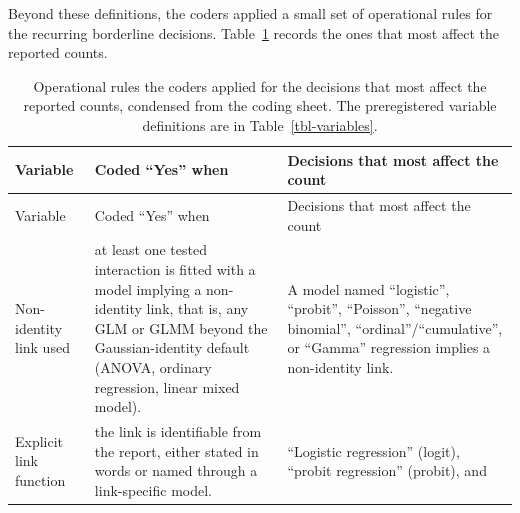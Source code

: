 \documentclass[
  man,
  floatsintext,
  longtable,
  nolmodern,
  notxfonts,
  notimes,
  colorlinks=true,linkcolor=blue,citecolor=blue,urlcolor=blue]{apa7}
\begin{document}
Beyond these definitions, the coders applied a small set of operational
rules for the recurring borderline decisions.
Table~\ref{tbl-coding-rules} records the ones that most affect the
reported counts.

\begin{longtable}[]{@{}
  >{\raggedright\arraybackslash}p{}
  >{\raggedright\arraybackslash}p{}
  >{\raggedright\arraybackslash}p{}@{}}
\caption{Operational rules the coders applied for the decisions that
most affect the reported counts, condensed from the coding sheet. The
preregistered variable definitions are in
Table~\ref{tbl-variables}.}\label{tbl-coding-rules}\tabularnewline
\toprule\noalign{}
\begin{minipage}[b]{\linewidth}\raggedright
Variable
\end{minipage} & \begin{minipage}[b]{\linewidth}\raggedright
Coded ``Yes'' when
\end{minipage} & \begin{minipage}[b]{\linewidth}\raggedright
Decisions that most affect the count
\end{minipage} \\
\midrule\noalign{}
\endfirsthead
\toprule\noalign{}
\begin{minipage}[b]{\linewidth}\raggedright
Variable
\end{minipage} & \begin{minipage}[b]{\linewidth}\raggedright
Coded ``Yes'' when
\end{minipage} & \begin{minipage}[b]{\linewidth}\raggedright
Decisions that most affect the count
\end{minipage} \\
\midrule\noalign{}
\endhead
\bottomrule\noalign{}
\endlastfoot
Non-identity link used & at least one tested interaction is fitted with
a model implying a non-identity link, that is, any GLM or GLMM beyond
the Gaussian-identity default (ANOVA, ordinary regression, linear mixed
model). & A model named ``logistic'', ``probit'', ``Poisson'',
``negative binomial'', ``ordinal''/``cumulative'', or ``Gamma''
regression implies a non-identity link. \\
Explicit link function & the link is identifiable from the report,
either stated in words or named through a link-specific model. &
``Logistic regression'' (logit), ``probit regression'' (probit), and

\end{longtable}
\end{document}
